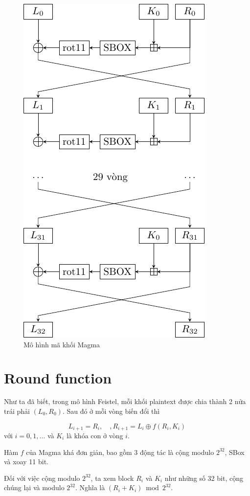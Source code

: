 \begin{figure}[ht]
    \centering
    \includegraphics{Magma/blocky.pdf}
    \caption{Mô hình mã khối Magma}
\end{figure}

\section{Round function}

Như ta đã biết, trong mô hình Feistel, mỗi khối plaintext
được chia thành 2 nửa trái phải $(L_0, R_0)$. Sau đó ở mỗi vòng
biến đổi thì

\[L_{i+1} = R_i, \quad, R_{i+1} = L_i \oplus f(R_i, K_i)\]
với $i=0, 1, \ldots$ và $K_i$ là khóa con ở vòng $i$.

Hàm $f$ của Magma khá đơn giản, bao gồm 3 động tác là cộng modulo 
$2^{32}$, SBox và xoay 11 bit.

Đối với việc cộng modulo $2^{32}$, ta xem block $R_i$ và $K_i$ như
những số 32 bit, cộng chúng lại và modulo $2^{32}$. Nghĩa là 
$(R_i + K_i) \bmod 2^{32}$.

